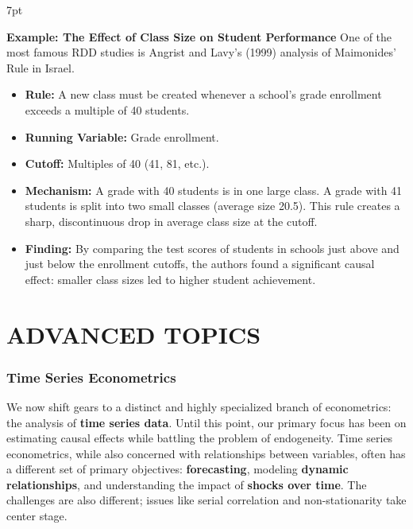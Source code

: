 \documentclass{article}
\newenvironment{redblock}{
\def\FrameCommand{
  \hspace{1pt}
    {\color{LightCoral}
    \vrule width 2pt}
    {\color{redshade}
    \vrule width 4pt}
  \colorbox{redshade}
}
\MakeFramed{
  \advance
  \hsize-
  \width
  \FrameRestore}
\noindent\hspace{-4.55pt}%
\begin{adjustwidth}{}{7pt}
\vspace{2pt}\vspace{2pt}
}
{\vspace{2pt}\end{adjustwidth}\endMakeFramed}
\begin{document}
\begin{redblock}
\textbf{Example: The Effect of Class Size on Student Performance}
One of the most famous RDD studies is Angrist and Lavy's (1999) analysis of Maimonides' Rule in Israel.
\begin{itemize}
    \item \textbf{Rule:} A new class must be created whenever a school's grade enrollment exceeds a multiple of 40 students.
    \item \textbf{Running Variable:} Grade enrollment.
    \item \textbf{Cutoff:} Multiples of 40 (41, 81, etc.).
    \item \textbf{Mechanism:} A grade with 40 students is in one large class. A grade with 41 students is split into two small classes (average size 20.5). This rule creates a sharp, discontinuous drop in average class size at the cutoff.
    \item \textbf{Finding:} By comparing the test scores of students in schools just above and just below the enrollment cutoffs, the authors found a significant causal effect: smaller class sizes led to higher student achievement.
\end{itemize}
\end{redblock}





\newpage
\part{ADVANCED TOPICS} %
\label{prt:advanced_ _topics_}


\section{Time Series Econometrics}
\label{sec:time_series}

We now shift gears to a distinct and highly specialized branch of econometrics: the analysis of \textbf{time series data}. Until this point, our primary focus has been on estimating causal effects while battling the problem of endogeneity. Time series econometrics, while also concerned with relationships between variables, often has a different set of primary objectives: \textbf{forecasting}, modeling \textbf{dynamic relationships}, and understanding the impact of \textbf{shocks over time}. The challenges are also different; issues like serial correlation and non-stationarity take center stage.
\end{document}
